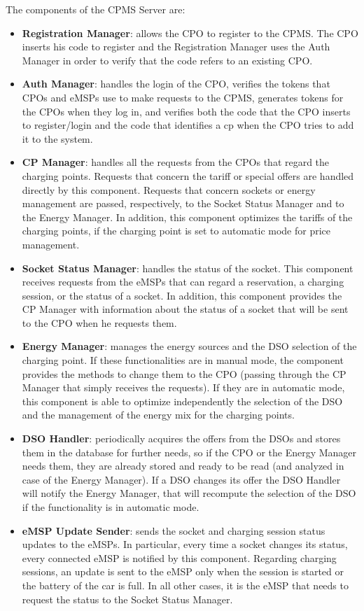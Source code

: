 \documentclass{Configuration_Files/PoliMi3i_thesis}
\begin{document}
The components of the CPMS Server are:
\begin{itemize}
    \item \textbf{Registration Manager}: allows the CPO to register to the CPMS. The CPO inserts his code to register and the Registration Manager uses the Auth Manager in order to verify that the code refers to an existing CPO.
    \item \textbf{Auth Manager}: handles the login of the CPO, verifies the tokens that CPOs and eMSPs use to make requests to the CPMS, generates tokens for the CPOs when they log in, and verifies both the code that the CPO inserts to register/login and the code that identifies a cp when the CPO tries to add it to the system.
    \item \textbf{CP Manager}: handles all the requests from the CPOs that regard the charging points. Requests that concern the tariff or special offers are handled directly by this component. Requests that concern sockets or energy management are passed, respectively, to the Socket Status Manager and to the Energy Manager. In addition, this component optimizes the tariffs of the charging points, if the charging point is set to automatic mode for price management.
    \item \textbf{Socket Status Manager}: handles the status of the socket. This component receives requests from the eMSPs that can regard a reservation, a charging session, or the status of a socket. In addition, this component provides the CP Manager with information about the status of a socket that will be sent to the CPO when he requests them.
    \item \textbf{Energy Manager}: manages the energy sources and the DSO selection of the charging point. If these functionalities are in manual mode, the component provides the methods to change them to the CPO (passing through the CP Manager that simply receives the requests). If they are in automatic mode, this component is able to optimize independently the selection of the DSO and the management of the energy mix for the charging points.
    \item \textbf{DSO Handler}: periodically acquires the offers from the DSOs and stores them in the database for further needs, so if the CPO or the Energy Manager needs them, they are already stored and ready to be read (and analyzed in case of the Energy Manager). If a DSO changes its offer the DSO Handler will notify the Energy Manager, that will recompute the selection of the DSO if the functionality is in automatic mode.
    \item \textbf{eMSP Update Sender}: sends the socket and charging session status updates to the eMSPs. In particular, every time a socket changes its status, every connected eMSP is notified by this component. Regarding charging sessions, an update is sent to the eMSP only when the session is started or the battery of the car is full. In all other cases, it is the eMSP that needs to request the status to the Socket Status Manager.

\end{itemize}
\end{document}
